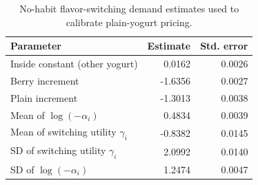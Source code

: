 \begin{table}[htbp]
\centering\small
\caption{No-habit flavor-switching demand estimates used to calibrate plain-yogurt pricing.}
\label{tab:demand-estimates}
\begin{tabular}{lrr}
\toprule
Parameter & Estimate & Std. error \\
\midrule
Inside constant (other yogurt) & 0.0162 & 0.0026 \\
Berry increment & -1.6356 & 0.0027 \\
Plain increment & -1.3013 & 0.0038 \\
Mean of $\log(-\alpha_i)$ & 0.4834 & 0.0039 \\
Mean of switching utility $\gamma_i$ & -0.8382 & 0.0145 \\
SD of switching utility $\gamma_i$ & 2.0992 & 0.0140 \\
SD of $\log(-\alpha_i)$ & 1.2474 & 0.0047 \\
\bottomrule
\end{tabular}
\end{table}
